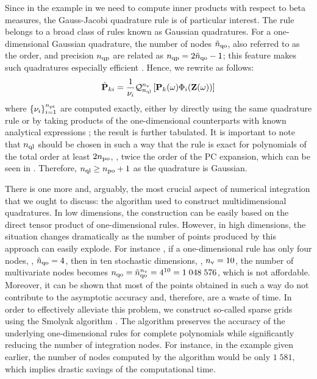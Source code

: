 Since in the example in  we need to compute inner products with respect to beta measures, the Gauss-Jacobi quadrature rule is of particular interest.
The rule belongs to a broad class of rules known as Gaussian quadratures.
For a one-dimensional Gaussian quadrature, the number of nodes ${\tilde{n}_\text{qo}}$, also referred to as the order, and precision ${n_\text{qp}}$ are related as ${n_\text{qp}} = 2 {\tilde{n}_\text{qo}} - 1$; this feature makes such quadratures especially efficient \cite{heiss2008}.
Hence, we rewrite  as follows:
\[
  \hat{\mathbf{P}}_{ki} = \frac{1}{\nu_i} \mathcal{Q}_{{n_\text{ql}}}^{{n_\text{v}}}\left[\mathbf{P}_k(\omega) \Phi_i(\mathbf{Z}(\omega))\right]
\]
where $\{ \nu_i \}_{i = 1}^{{n_\text{pt}}}$ are computed exactly, either by directly using the same quadrature rule or by taking products of the one-dimensional counterparts with known analytical expressions \cite{xiu2010}; the result is further tabulated.
It is important to note that ${n_\text{ql}}$ should be chosen in such a way that the rule is exact for polynomials of the total order at least $2 {n_\text{po}}$, \ie, twice the order of the PC expansion, which can be seen in  \cite{eldred2008}.
Therefore, ${n_\text{ql}} \geq {n_\text{po}} + 1$ as the quadrature is Gaussian.

There is one more and, arguably, the most crucial aspect of numerical integration that we ought to discuss: the algorithm used to construct multidimensional quadratures.
In low dimensions, the construction can be easily based on the direct tensor product of one-dimensional rules.
However, in high dimensions, the situation changes dramatically as the number of points produced by this approach can easily explode.
For instance \cite{heiss2008}, if a one-dimensional rule has only four nodes, \ie, ${\tilde{n}_\text{qo}} = 4$, then in ten stochastic dimensions, \ie, ${n_\text{v}} = 10$, the number of multivariate nodes becomes ${n_\text{qo}} = {\tilde{n}_\text{qo}}^{n_\text{v}} = 4^{10} = 1\;048\;576$, which is not affordable.
Moreover, it can be shown that most of the points obtained in such a way do not contribute to the asymptotic accuracy and, therefore, are a waste of time.
In order to effectively alleviate this problem, we construct so-called sparse grids using the Smolyak algorithm \cite{eldred2008, heiss2008, burkardt2013}.
The algorithm preserves the accuracy of the underlying one-dimensional rules for complete polynomials while significantly reducing the number of integration nodes.
For instance, in the example given earlier, the number of nodes computed by the algorithm would be only $1\;581$, which implies drastic savings of the computational time.
